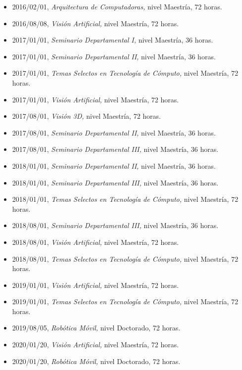 \begin{itemize} 
\item 2016/02/01, \textit{ Arquitectura de Computadoras,} nivel Maestría, 72 horas. 
\item 2016/08/08, \textit{ Visión Artificial,} nivel Maestría, 72 horas. 
\item 2017/01/01, \textit{ Seminario Departamental I,} nivel Maestría, 36 horas. 
\item 2017/01/01, \textit{ Seminario Departamental II,} nivel Maestría, 36 horas. 
\item 2017/01/01, \textit{ Temas Selectos en Tecnología de Cómputo,} nivel Maestría, 72 horas. 
\item 2017/01/01, \textit{ Visión Artificial,} nivel Maestría, 72 horas. 
\item 2017/08/01, \textit{ Visión 3D,} nivel Maestría, 72 horas. 
\item 2017/08/01, \textit{ Seminario Departamental II,} nivel Maestría, 36 horas. 
\item 2017/08/01, \textit{ Seminario Departamental III,} nivel Maestría, 36 horas. 
\item 2018/01/01, \textit{ Seminario Departamental II,} nivel Maestría, 36 horas. 
\item 2018/01/01, \textit{ Seminario Departamental III,} nivel Maestría, 36 horas. 
\item 2018/01/01, \textit{ Temas Selectos en Tecnología de Cómputo,} nivel Maestría, 72 horas. 
\item 2018/08/01, \textit{ Seminario Departamental III,} nivel Maestría, 36 horas. 
\item 2018/08/01, \textit{ Visión Artificial,} nivel Maestría, 72 horas. 
\item 2018/08/01, \textit{ Temas Selectos en Tecnología de Cómputo,} nivel Maestría, 72 horas. 
\item 2019/01/01, \textit{ Visión Artificial,} nivel Maestría, 72 horas. 
\item 2019/01/01, \textit{ Temas Selectos en Tecnología de Cómputo,} nivel Maestría, 72 horas. 
\item 2019/08/05, \textit{ Robótica Móvil,} nivel Doctorado, 72 horas. 
\item 2020/01/20, \textit{ Visión Artificial,} nivel Maestría, 72 horas. 
\item 2020/01/20, \textit{ Robótica Móvil,} nivel Doctorado, 72 horas. 
\end{itemize} 
